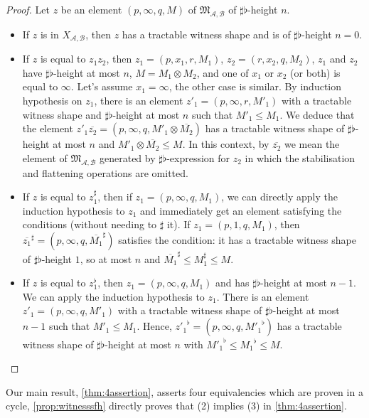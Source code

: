 \documentclass{lmcs}
\theoremstyle{remark}
\newcommand{\ideal}{\mathfrak{M}}
\newcommand{\autA}{\mathcal{A}}
\newcommand{\autB}{\mathcal{B}}
\theoremstyle{remark}
\begin{document}
\begin{proof}
Let $z$ be an element $(p,\infty,q,M)$ of $\ideal_{\autA,\autB}$ of $\sharp\flat$-height $n$.
\begin{itemize}
\item If $z$ is in $X_{\autA,\autB}$, then $z$ has a tractable witness shape and is of $\sharp\flat$-height $n=0$.
\item If $z$ is equal to $z_1z_2$, then $z_1= (p,x_1,r,M_1)$, $z_2 = (r,x_2,q,M_2)$, $z_1$ and $z_2$ have $\sharp\flat$-height at most $n$, $M=M_1\otimes M_2$, and one of $x_1$ or $x_2$ (or both) is equal to $\infty$. Let's assume $x_1 = \infty$, the other case is similar. By induction hypothesis on $z_1$, there is an element $z'_1 = (p,\infty,r,M'_1)$ with a tractable witness shape and $\sharp\flat$-height at most $n$ such that $M'_1 \leq M_1$. We deduce that the element $z'_1\overline{z_2} = (p,\infty,q,M'_1\otimes \overline{M_2})$ has a tractable witness shape of $\sharp\flat$-height at most $n$ and $M'_1\otimes \overline{M_2} \leq M$. In this context, by $\overline{z_2}$ we mean the element of $\ideal_{\autA,\autB}$ generated by $\sharp\flat$-expression for $z_2$ in which the stabilisation and flattening operations are omitted. 
\item  If $z$ is equal to $z_1^\sharp$, then if $z_1= (p,\infty,q,M_1)$, we can directly apply the induction hypothesis to $z_1$ and immediately get an element satisfying the conditions (without needing to $\sharp$ it). If $z_1= (p,1,q,M_1)$, then $\overline{z_1}^\sharp = (p,\infty,q,\overline{M_1}^\sharp)$ satisfies the condition: it has a tractable witness shape of $\sharp\flat$-height $1$, so at most $n$ and $\overline{M_1}^\sharp \leq M_1^\sharp \leq M$.
\item If $z$ is equal to $z_1^\flat$, then $z_1= (p,\infty,q,M_1)$ and has $\sharp\flat$-height at most $n-1$. We can apply the induction hypothesis to $z_1$. There is an element $z'_1 = (p,\infty,q,M'_1)$ with a tractable witness shape of $\sharp\flat$-height at most $n-1$ such that $M'_1 \leq M_1$. Hence, ${z'_1}^\flat = (p,\infty,q,{M'_1}^\flat)$ has a tractable witness shape of $\sharp\flat$-height at most $n$ with ${M'_1}^\flat \leq {M_1}^\flat \leq M$.  \qedhere
\end{itemize}
\end{proof}

\begin{rem}
Our main result, \cref{thm:4assertion}, asserts four equivalencies which are proven in a cycle,
    \cref{prop:witnesssfh} directly proves that (2) implies (3) in \cref{thm:4assertion}.
\end{rem}
\end{document}
